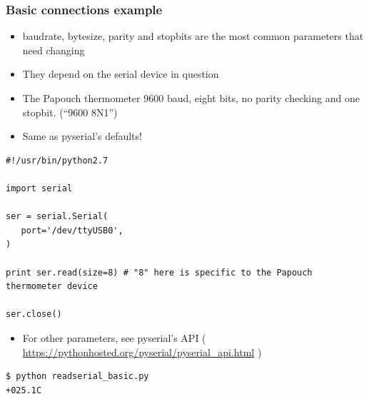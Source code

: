 \documentclass[aspectratio=1610,9pt]{beamer} %
\begin{document}
\begin{frame}[fragile]
\frametitle{Basic connections example}

\begin{itemize}
\itemsep1pt\parskip0pt
\item
  baudrate, bytesize, parity and stopbits are the most common parameters
  that need changing
\item
  They depend on the serial device in question
\item
  The Papouch thermometer 9600 baud, eight bits, no parity checking and
  one stopbit. (``9600 8N1'')
\item
  Same as pyserial's defaults!
\end{itemize}

\begin{verbatim}
#!/usr/bin/python2.7

import serial

ser = serial.Serial(
   port='/dev/ttyUSB0',
)

print ser.read(size=8) # "8" here is specific to the Papouch thermometer device

ser.close()
\end{verbatim}

\begin{itemize}
\itemsep1pt\parskip0pt
\item
  For other parameters, see pyserial's API (
  \href{https://pythonhosted.org/pyserial/pyserial_api.html}{https://pythonhosted.org/pyserial/pyserial\_api.html}
  )
\end{itemize}

\begin{verbatim}
$ python readserial_basic.py
+025.1C
\end{verbatim}

\end{frame}
\end{document}
